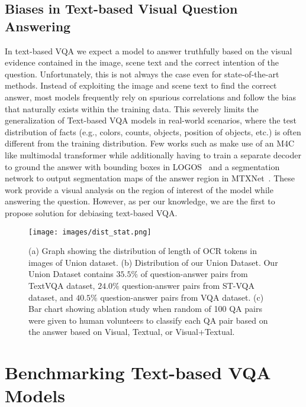 \documentclass[10pt,twocolumn,letterpaper]{article}
\begin{document}
\subsection{Biases in Text-based Visual Question Answering}
In text-based VQA we expect a model to answer truthfully based on the visual evidence contained in the image, scene text and the correct intention of the question. Unfortunately, this is not always the case even for state-of-the-art methods. Instead of exploiting the image and scene text to find the correct answer, most models frequently rely on spurious correlations and follow the bias that naturally exists within the training data. This severely limits the generalization of Text-based VQA models in real-world scenarios, where the test distribution of facts (e.g., colors, counts, objects, position of objects, etc.) is often different from the training distribution. Few works such as \cite{logos, towards_explainable_textvqa_model} make use of an M4C~\cite{M4C:2020} like multimodal transformer while additionally having to train a separate decoder to ground the answer with bounding boxes in LOGOS~\cite{logos} and a segmentation network to output segmentation maps of the answer region in MTXNet~\cite{towards_explainable_textvqa_model}. These work provide a visual analysis on the region of interest of the model while answering the question. However, as per our knowledge, we are the first to propose solution for debiasing text-based VQA. 


\begin{figure*}
    \centering
    \texttt{[image: images/dist\_stat.png]}
    \caption{(a) Graph showing the distribution of length of OCR tokens in images of Union dataset. (b) Distribution of our Union Dataset. Our Union Dataset contains $35.5\%$ of question-answer pairs from TextVQA \cite{textVQA} dataset, $24.0\%$ question-answer pairs from ST-VQA \cite{stvqa} dataset, and $40.5\%$ question-answer pairs from VQA \cite{first-vqa:2017} dataset. (c) Bar chart showing ablation study when random of 100 QA pairs were given to human volunteers to classify each QA pair based on the answer based on Visual, Textual, or Visual+Textual.} 
    \label{fig:dist_dataset}
\end{figure*}




\section{Benchmarking Text-based VQA Models}
\label{lab:benchmarking}
\end{document}
